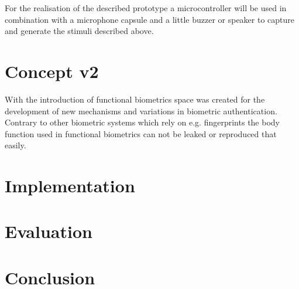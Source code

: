 For the realisation of the described prototype a microcontroller will be used in combination with a microphone capsule and a little buzzer or speaker to capture and generate the stimuli described above.

\section{Concept v2}
With the introduction of functional biometrics space was created for the development of new mechanisms and variations in biometric authentication.
Contrary to other biometric systems which rely on e.g. fingerprints the body function used in functional biometrics can not be leaked or reproduced that easily.


\section{Implementation}
\section{Evaluation}
\section{Conclusion}
